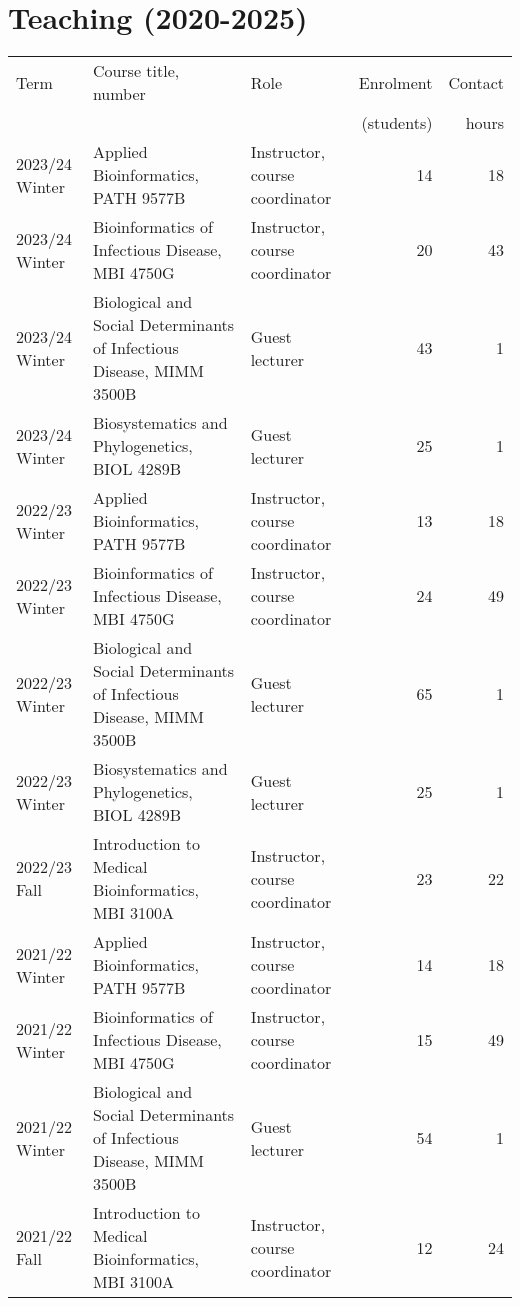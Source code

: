 

\section{Teaching (2020-2025)}



\bgroup
\setlength{\tabcolsep}{6pt}
\def\arraystretch{1.3}%
\begin{tabular}{lp{2.35in}p{1.2in}rr}
Term & Course title, number & Role & Enrolment & Contact\\[-3pt]
  &  &  &  (students) & hours \\
\hline

2023/24 Winter & Applied Bioinformatics, PATH 9577B & Instructor, course coordinator & 14 & 18\\
2023/24 Winter & Bioinformatics of Infectious Disease, MBI 4750G & Instructor, course coordinator & 20 & 43\\ 
2023/24 Winter & Biological and Social Determinants of Infectious Disease, MIMM 3500B & Guest lecturer & 43 & 1\\
2023/24 Winter & Biosystematics and Phylogenetics, BIOL 4289B & Guest lecturer & 25 & 1\\

2022/23 Winter & Applied Bioinformatics, PATH 9577B & Instructor, course coordinator & 13 & 18\\
2022/23 Winter & Bioinformatics of Infectious Disease, MBI 4750G & Instructor, course coordinator & 24 & 49\\
2022/23 Winter & Biological and Social Determinants of Infectious Disease, MIMM 3500B & Guest lecturer & 65 & 1\\
2022/23 Winter & Biosystematics and Phylogenetics, BIOL 4289B & Guest lecturer & 25 & 1\\

2022/23 Fall & Introduction to Medical Bioinformatics, MBI 3100A & Instructor, course coordinator & 23 & 22\\


2021/22 Winter & Applied Bioinformatics, PATH 9577B & Instructor, course coordinator & 14 & 18\\
2021/22 Winter & Bioinformatics of Infectious Disease, MBI 4750G & Instructor, course coordinator & 15 & 49\\
2021/22 Winter & Biological and Social Determinants of Infectious Disease, MIMM 3500B & Guest lecturer & 54 & 1\\
2021/22 Fall & Introduction to Medical Bioinformatics, MBI 3100A & Instructor, course coordinator & 12 & 24\\


\end{tabular}
